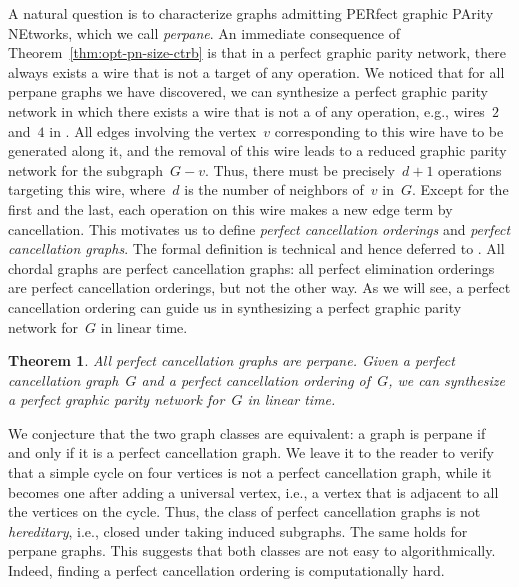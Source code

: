 \documentclass[a4paper,cleveref, autoref, 11pt, fleqn, thm-restate]{article}
\newcommand{\ptt}{perpane}
\theoremstyle{plain}
\newtheorem{theorem}{Theorem}[section]
\begin{document}
A natural question is to characterize graphs admitting PERfect graphic PArity NEtworks, which we call \emph{\ptt{}}.
An immediate consequence of Theorem~\ref{thm:opt-pn-size-ctrb} is that in a perfect graphic parity network, there always exists a wire that is not a target of any operation.  We noticed that for all \ptt{} graphs we have discovered, we can synthesize a perfect graphic parity network in which there exists a wire that is not a  of any operation, e.g., wires~$2$ and~$4$ in .  All edges involving the vertex~$v$ corresponding to this wire have to be generated along it, and the removal of this wire leads to a reduced graphic parity network for the subgraph~$G - v$.  Thus, there must be precisely~$d + 1$ operations targeting this wire, where~$d$ is the number of neighbors of~$v$ in~$G$.  Except for the first and the last, each operation on this wire makes a new edge term by cancellation.
This motivates us to define \emph{perfect cancellation orderings} and \emph{perfect cancellation graphs}.  The formal definition is technical and hence deferred to .
All chordal graphs are perfect cancellation graphs: all perfect elimination orderings~\cite{roseTriangulatedGraphsElimination1970} are perfect cancellation orderings, but not the other way.
As we will see, a perfect cancellation ordering can guide us in synthesizing a perfect graphic parity network for~$G$ in linear time.

\begin{theorem}
  \label{thm:chordal-ideal}
  All perfect cancellation graphs are \ptt.  Given a perfect cancellation graph~$G$ and a perfect cancellation ordering of~$G$, we can synthesize a perfect graphic parity network for~$G$ in linear time.
\end{theorem}

We conjecture that the two graph classes are equivalent: a graph is \ptt{} if and only if it is a perfect cancellation graph.  %
We leave it to the reader to verify that a simple cycle on four vertices is not a perfect cancellation graph, while it becomes one after adding a universal vertex, i.e., a vertex that is adjacent to all the vertices on the cycle.  Thus, the class of perfect cancellation graphs is not \emph{hereditary}, i.e., closed under taking induced subgraphs.  The same holds for \ptt{} graphs.
This suggests that both classes are not easy to  algorithmically.  Indeed, finding a perfect cancellation ordering is computationally hard.
\end{document}

